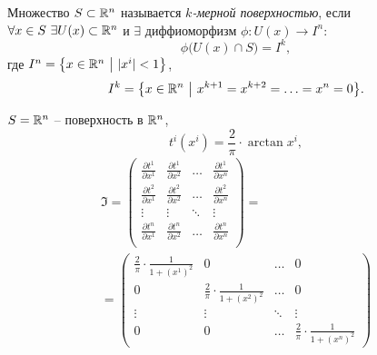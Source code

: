 

\begin{definition}
    Множество $ S \subset \mathbb{R}^n $ называется \emph{$ k $-мерной поверхностью}, если $ \forall x \in S \ \exists U(x)\subset\R^n $ и $ \exists $ диффиоморфизм $ \phi: U(x)\rightarrow I^n $:
    \[
        \phi\big(U(x)\cap S\big) = I^k,
    \] где $ I^n = \big\{x \in \mathbb{R}^n \ \big| \ |x^i| < 1 \big\} $,
    \[
        I^k = \big\{x \in \mathbb{R}^n \ \big| \ x^{k+1} = x^{k+2} = \ldots = x^n = 0\big\}.
    \]
\end{definition}

\newpage

\begin{example}
    $S = \mathbb{R}^n$ -- поверхность в $\mathbb{R}^n$,
    \[
        t^i(x^i) = \frac{2}{\pi}\cdot \arctan x^i,
    \]
    \begin{multline*}
        \mathfrak{I} = \left(\begin{matrix}
                \frac{\partial t^1}{\partial x^1} & \frac{\partial t^1}{\partial x^2} & \ldots & \frac{\partial t^1}{\partial x^n} \\
                \frac{\partial t^2}{\partial x^1} & \frac{\partial t^2}{\partial x^2} & \ldots & \frac{\partial t^2}{\partial x^n} \\
                \vdots                        & \vdots                        & \ddots & \vdots                        \\
                \frac{\partial t^n}{\partial x^1} & \frac{\partial t^n}{\partial x^2} & \ldots & \frac{\partial t^n}{\partial x^n} \\
            \end{matrix}\right) = \\
        = \left(\begin{matrix}
                \frac{2}{\pi} \cdot \frac{1}{1 + (x^1)^2} & 0                                         & \ldots & 0                                         \\
                0                                         & \frac{2}{\pi} \cdot \frac{1}{1 + (x^2)^2} & \ldots & 0                                         \\
                \vdots                                    & \vdots                                    & \ddots & \vdots                                    \\
                0                                         & 0                                         & \ldots & \frac{2}{\pi} \cdot \frac{1}{1 + (x^n)^2}
            \end{matrix}\right)
    \end{multline*}
\end{example}


